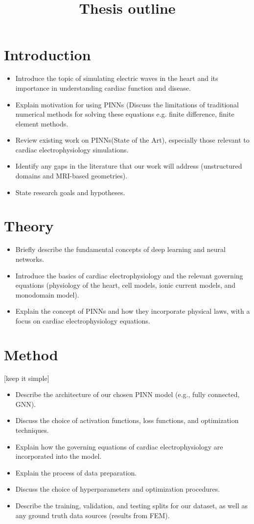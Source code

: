 \documentclass{article}
\title{Thesis outline}
\date{}
\begin{document}
\maketitle


\section{Introduction}
\begin{itemize}
    \item Introduce the topic of simulating electric waves in the heart and its importance in understanding cardiac function and disease.
    \item Explain motivation for using PINNs (Discuss the limitations of traditional numerical methods for solving these equations e.g. finite difference, finite element methods.
    \item Review existing work on PINNs(State of the Art), especially those relevant to cardiac electrophysiology simulations.
    \item Identify any gaps in the literature that our work will address (unstructured domains and MRI-based geometries).
    \item State research goals and hypotheses.
\end{itemize}

\section{Theory}
\begin{itemize}
    \item Briefly describe the fundamental concepts of deep learning and neural networks.
    \item Introduce the basics of cardiac electrophysiology and the relevant governing equations (physiology of the heart, cell models, ionic current models, and monodomain model).
    \item Explain the concept of PINNs and how they incorporate physical laws, with a focus on cardiac electrophysiology equations.
\end{itemize}

\section{Method}
[keep it simple]
\begin{itemize}
    \item Describe the architecture of our chosen PINN model (e.g., fully connected, GNN).
    \item Discuss the choice of activation functions, loss functions, and optimization techniques.
    \item Explain how the governing equations of cardiac electrophysiology are incorporated into the model.
    \item Explain the process of data preparation.
    \item Discuss the choice of hyperparameters and optimization procedures.
    \item Describe the training, validation, and testing splits for our dataset, as well as any ground truth data sources (results from FEM).
\end{itemize}
\end{document}
